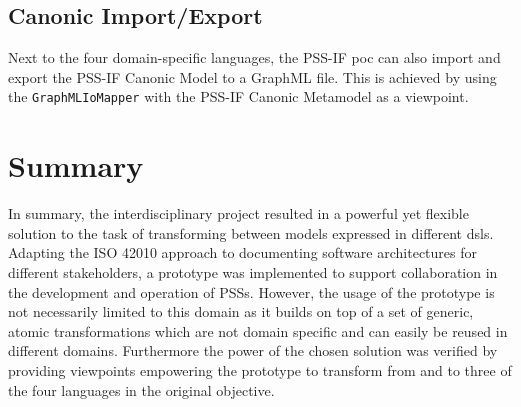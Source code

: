 \subsection{Canonic Import/Export}

Next to the four domain-specific languages, the PSS-IF \gls{poc} can also import and export the PSS-IF Canonic Model to a GraphML file. This is achieved by using the \texttt{GraphMLIoMapper} with the PSS-IF Canonic Metamodel as a viewpoint.


\section{Summary}
\label{sec:results:summary}

In summary, the interdisciplinary project resulted in a powerful yet flexible solution to the task of transforming between models expressed in different \glspl{dsl}. Adapting the ISO 42010 approach \cite{ref:42010} to documenting software architectures for different stakeholders, a prototype was implemented to support collaboration in the development and operation of \glspl{PSS}. However, the usage of the prototype is not necessarily limited to this domain as it builds on top of a set of generic, atomic transformations which are not domain specific and can easily be reused in different domains. Furthermore the power of the chosen solution was verified by providing viewpoints empowering the prototype to transform from and to three of the four languages in the original objective.